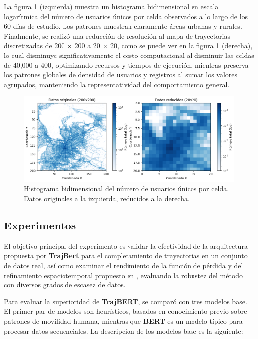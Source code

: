 La figura \ref{fig:unique_user_per_cell_2_dimensional_histogram} (izquierda) muestra un histograma bidimensional en escala logarítmica del número de usuarios únicos por celda observados a lo largo de los 60 días de estudio. Los patrones muestran claramente áreas urbanas y rurales. Finalmente, se realizó una reducción de resolución al mapa de trayectorias discretizadas de 200 × 200 a 20 × 20, como se puede ver en la figura \ref{fig:unique_user_per_cell_2_dimensional_histogram} (derecha), lo cual disminuye significativamente el costo computacional al disminuir las celdas de 40,000 a 400, optimizando recursos y tiempos de ejecución, mientras preserva los patrones globales de densidad de usuarios y registros al sumar los valores agrupados, manteniendo la representatividad del comportamiento general.

\begin{figure}[!htb] \centering \includegraphics[width=1\textwidth]{Graphics/unique_user_per_cell_2_dimensional_histogram.png} \caption{Histograma bidimensional del número de usuarios únicos por celda. Datos originales a la izquierda, reducidos a la derecha.} \label{fig:unique_user_per_cell_2_dimensional_histogram} 
\end{figure}

\subsection{Experimentos}

El objetivo principal del experimento es validar la efectividad de la arquitectura propuesta por \textbf{TrajBert} para el completamiento de trayectorias en un conjunto de datos real, así como examinar el rendimiento de la función de pérdida y del refinamiento espaciotemporal propuesto en \cite{si2023trajbert}, evaluando la robustez del método con diversos grados de escasez de datos.

Para evaluar la superioridad de \textbf{TrajBERT}, se comparó con tres modelos base. El primer par de modelos son heurísticos, basados en conocimiento previo sobre patrones de movilidad humana, mientras que \textbf{BERT} es un modelo típico para procesar datos secuenciales. La descripción de los modelos base es la siguiente:


